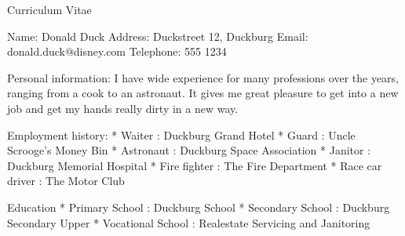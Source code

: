 \documentclass[a4paper,portrait,12pt]{article}
\begin{document}
\setlength{\oddsidemargin}{1.0000in-1in}
\setlength{\textwidth}{\paperwidth - 1.0000in-1.0000in}


Curriculum Vitae

Name:       Donald Duck
Address:    Duckstreet 12, Duckburg
Email:      donald.duck@disney.com
Telephone:  555 1234

Personal information:
I have wide experience for many professions over the years, ranging
from a cook to an astronaut. It gives me great pleasure to get into a new job and get my
hands really dirty in a new way.


Employment history:
  * Waiter :  Duckburg Grand Hotel
  * Guard :  Uncle Scrooge's Money Bin
  * Astronaut :  Duckburg Space Association
  * Janitor :  Duckburg Memorial Hospital
  * Fire fighter :  The Fire Department
  * Race car driver :  The Motor Club


Education
  * Primary School :  Duckburg School
  * Secondary School :  Duckburg Secondary Upper
  * Vocational School :  Realestate Servicing and Janitoring
\end{document}
